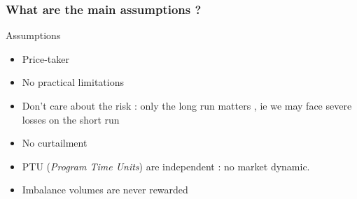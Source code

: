 \begin{frame}\frametitle{What are the main assumptions ?}
\begin{block}{Assumptions}
\begin{itemize}
  \item Price-taker %
  \item No practical limitations
  \item Don't care about the risk : only the long run matters , ie we may face
  severe losses on the short run
  \item No curtailment %
  \item PTU (\textit{Program Time Units}) are independent : no market dynamic.
  \item Imbalance volumes are never rewarded
\end{itemize}
\end{block}
\end{frame}


